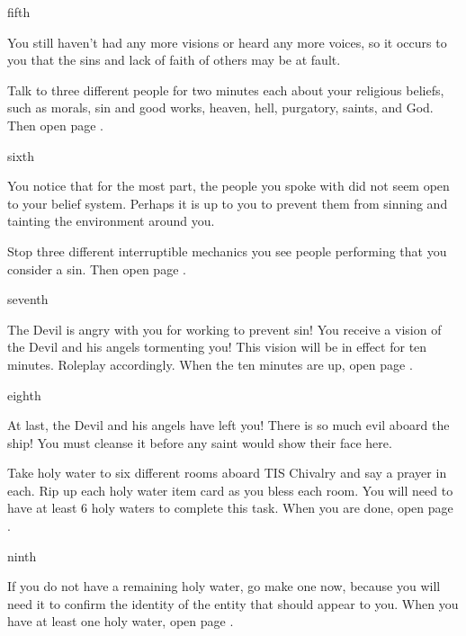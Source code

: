 \documentclass[greennotebook]{guildcamp4} %
\begin{document}
\begin{page}{fifth}

You still haven't had any more visions or heard any more voices, so it occurs to you that the sins and lack of faith of others may be at fault.

Talk to three different people for two minutes each about your religious beliefs, such as morals, sin and good works, heaven, hell, purgatory, saints, and God. Then open page .

\end{page}

\begin{page}{sixth}

You notice that for the most part, the people you spoke with did not seem open to your belief system. Perhaps it is up to you to prevent them from sinning and tainting the environment around you.

Stop three different interruptible mechanics you see people performing that you consider a sin. Then open page .

\end{page}

\begin{page}{seventh}

The Devil is angry with you for working to prevent sin! You receive a vision of the Devil and his angels tormenting you! This vision will be in effect for ten minutes. Roleplay accordingly. When the ten minutes are up, open page .

\end{page}

\begin{page}{eighth}

At last, the Devil and his angels have left you! There is so much evil aboard the ship! You must cleanse it before any saint would show their face here.

Take holy water to six different rooms aboard TIS Chivalry and say a prayer in each. Rip up each holy water item card as you bless each room. You will need to have at least 6 holy waters to complete this task. When you are done, open page .

\end{page}

\begin{page}{ninth}

If you do not have a remaining holy water, go make one now, because you will need it to confirm the identity of the entity that should appear to you. When you have at least one holy water, open page .

\end{page}
\end{document}
